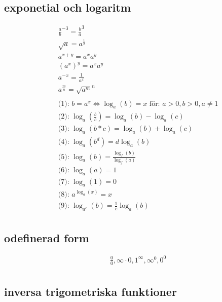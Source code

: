 \subsection{exponetial och logaritm}  %
\begin{align*}
  &\quad {\frac{a}{b}}^{-3} = {\frac{b}{a}}^{3} \\
  &\quad \sqrt{a} = a^{\frac{1}{2}} \\
  &\quad a^{x+y}=a^{x}a^{y} \\
  &\quad {(a^{x})}^y=a^{x}a^{y} \\
  &\quad a^{-x}=\frac{1}{a^x} \\
  &\quad a^{\frac{m}{n}}={\sqrt{a^{m}}}^{n} \\
  &\quad  \\
  &\quad \text{(1): } b = a^x \Leftrightarrow \log_a(b) = x  \text{ för: } a>0, b>0, a \ne 1  \\
  &\quad \text{(2): } \log_a(\frac{b}{c}) = \log_a(b) - \log_a(c) \\
  &\quad \text{(3): } \log_a(b*c) = \log_a(b) + \log_a(c) \\
  &\quad \text{(4): } \log_a(b^d) = d\log_a(b) \\
  &\quad \text{(5): } \log_a(b) = \frac{\log_f(b)}{\log_f(a)} \\
  &\quad \text{(6): } \log_a(a) = 1 \\
  &\quad \text{(7): } \log_a(1) = 0 \\
  &\quad \text{(8): } a^{\log_a(x)} = x \\
  &\quad \text{(9): } \log_{a^c}(b) = \frac{1}{c} \log_a(b) \\
\end{align*}



\subsection{odefinerad form}
\begin{align*}
  &\quad  \frac{0}{0},\infty\cdot{0},1^{\infty},\infty^0,0^0 \\
\end{align*}


\newpage

\subsection{inversa trigometriska funktioner}
